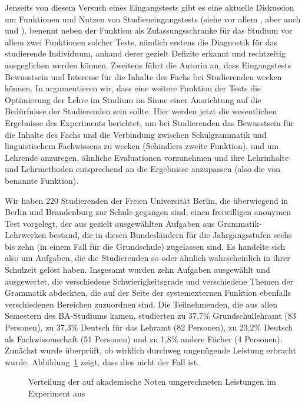 Jenseits von diesem Versuch eines Eingangstests gibt es eine aktuelle Diskussion um Funktionen und Nutzen von Studieneingangstests (siehe vor allem \citealt{Schindler2016}, aber \zB auch \citealt{Bremerichvos2016} und \citealt{FuhrhopTeuber2016}).
\citet[16]{Schindler2016} benennt neben der Funktion als Zulassungsschranke für das Studium vor allem zwei Funktionen solcher Tests, nämlich erstens die Diagnostik für das studierende Individuum, anhand derer gezielt Defizite erkannt und rechtzeitig ausgeglichen werden können.
Zweitens führt die Autorin an, dass Eingangstests Bewusstsein und Interesse für die Inhalte des Fachs bei Studierenden wecken können.
In \citet[226]{SchaeferSayatz2017a} argumentieren wir, dass eine weitere Funktion der Tests die Optimierung der Lehre im Studium im Sinne einer Ausrichtung auf die Bedürfnisse der Studierenden sein sollte.
Hier werden jetzt die wesentlichen Ergebnisse des Experiments berichtet, um bei Studierenden das Bewusstsein für die Inhalte des Fachs und die Verbindung zwischen Schulgrammatik und linguistischem Fachwissens zu wecken (Schindlers zweite Funktion), und um Lehrende anzuregen, ähnliche Evaluationen vorzunehmen und ihre Lehrinhalte und Lehrmethoden entsprechend an die Ergebnisse anzupassen (also die von \citealt{SchaeferSayatz2017a} benannte Funktion).

Wir haben 220 Studierenden der Freien Universität Berlin, die überwiegend in Berlin und Brandenburg zur Schule gegangen sind, einen freiwilligen anonymen Test vorgelegt, der aus gezielt ausgewählten Aufgaben aus Grammatik-Lehrwerken bestand, die in diesen Bundesländern für die Jahrgangsstufen sechs bis zehn (in einem Fall für die Grundschule) zugelassen sind.
Es handelte sich also um Aufgaben, die die Studierenden so oder ähnlich wahrscheinlich in ihrer Schulzeit gelöst haben.
Insgesamt wurden zehn Aufgaben ausgewählt und ausgewertet, die verschiedene Schwierigkeitsgrade und verschiedene Themen der Grammatik abdeckten, die auf der Seite der systemexternen Funktion ebenfalls verschiedenen Bereichen zuzuordnen sind.
Die Teilnehmenden, die aus allen Semestern des BA-Studiums kamen, studierten zu 37,7\% Grundschullehramt (83 Personen), zu 37,3\% Deutsch für das Lehramt (82 Personen), zu 23,2\% Deutsch als Fachwissenschaft (51 Personen) und zu 1,8\% andere Fächer (4 Personen).
Zunächst wurde überprüft, ob wirklich durchweg ungenügende Leistung erbracht wurde.
Abbildung~\ref{fig:grammatikkentnissevonstudierenden001} zeigt, dass dies nicht der Fall ist.

\begin{figure}[htpb]
  \centering
  \caption{Verteilung der auf akademische Noten umgerechneten Leistungen im Experiment aus \citet{SchaeferSayatz2017a}}
  \label{fig:grammatikkentnissevonstudierenden001}
\end{figure}

